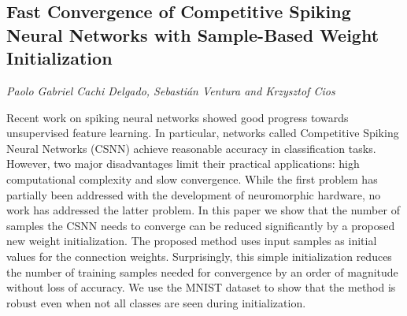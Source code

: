 \documentclass[../booklet.tex]{subfiles}
\begin{document}
\subsection[Fast Convergence of Competitive Spiking Neural Networks with Sample-Based Weight Initialization. {\it Paolo Gabriel Cachi Delgado, Sebastián Ventura and Krzysztof Cios}]{Fast Convergence of Competitive Spiking Neural Networks with Sample-Based Weight Initialization}
  

\begin{center}
  {\it Paolo Gabriel Cachi Delgado, Sebastián Ventura and Krzysztof Cios}
\end{center}



Recent work on spiking neural networks showed good progress towards unsupervised feature learning. In particular, networks called Competitive Spiking Neural Networks (CSNN) achieve reasonable accuracy in classification tasks. However, two major disadvantages limit their practical applications: high computational complexity and slow convergence. While the first problem has partially been addressed with the development of neuromorphic hardware, no work has addressed the latter problem. In this paper we show that the number of samples the CSNN needs to converge can be reduced significantly by a proposed new weight initialization. The proposed method uses input samples as initial values for the connection weights. Surprisingly, this simple initialization reduces the number of training samples needed for convergence by an order of magnitude without loss of accuracy. We use the MNIST dataset to show that the method is robust even when not all classes are seen during initialization.

\end{document}

